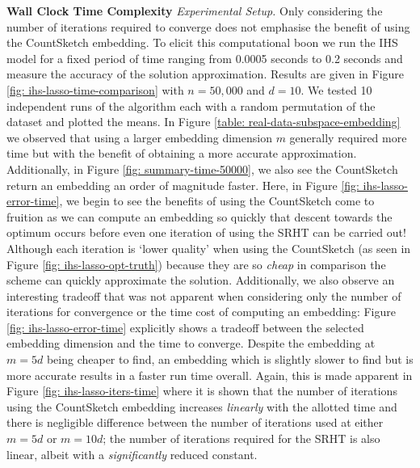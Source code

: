 \noindent
\textbf{Wall Clock Time Complexity}
\textit{Experimental Setup.}
Only considering the number of iterations required to converge does not
emphasise the benefit of using the CountSketch embedding.
To elicit this computational boon we run the IHS model for a fixed period of
time ranging from 0.0005 seconds to 0.2 seconds and measure the accuracy of
the solution approximation.
Results are given in Figure \ref{fig: ihs-lasso-time-comparison} with
$n=50,000$ and $d=10$.
We tested 10 independent runs of the
algorithm each with a random permutation of the dataset and plotted the means.
In Figure \ref{table: real-data-subspace-embedding} we observed that using a
larger embedding dimension $m$ generally required more time but with the benefit
of obtaining a more accurate approximation.
Additionally, in Figure \ref{fig: summary-time-50000}, we also see the CountSketch
return an embedding an order of magnitude faster.
Here, in Figure \ref{fig: ihs-lasso-error-time}, we begin to see the benefits of
using the CountSketch come to fruition as we can compute an embedding so quickly
that
descent towards the optimum occurs before even one iteration of using the
SRHT can be carried out!
Although each iteration is `lower quality' when using the CountSketch (as seen
in Figure \ref{fig: ihs-lasso-opt-truth}) because they are so \textit{cheap}
in comparison the scheme can quickly approximate the solution.
Additionally, we also observe an interesting tradeoff that was not apparent when
considering only the number of iterations for convergence or the time cost of
computing an embedding: Figure \ref{fig: ihs-lasso-error-time} explicitly shows
a tradeoff between the selected embedding dimension and the time to converge.
Despite the embedding at $m=5d$ being cheaper to find, an embedding which is
slightly slower to find but is more accurate results in a faster run time overall.
Again, this is made apparent in Figure \ref{fig: ihs-lasso-iters-time} where
it is shown that the number of iterations using the CountSketch embedding
increases \textit{linearly} with the allotted time and there is negligible
difference between the number of iterations used at either $m=5d$ or $m=10d$;
the number of iterations required for the SRHT is also linear, albeit with a
\textit{significantly} reduced constant.



